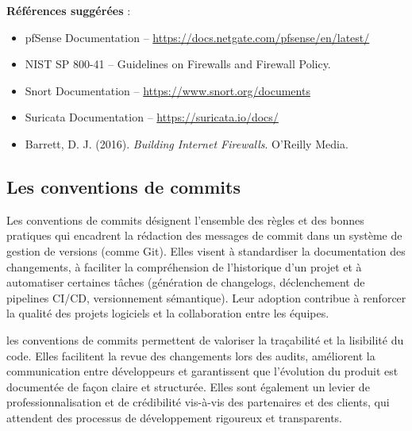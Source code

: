 \textbf{Références suggérées} :
\begin{itemize}
	\item pfSense Documentation – \url{https://docs.netgate.com/pfsense/en/latest/}
	\item NIST SP 800-41 – Guidelines on Firewalls and Firewall Policy.
	\item Snort Documentation – \url{https://www.snort.org/documents}
	\item Suricata Documentation – \url{https://suricata.io/docs/}
	\item Barrett, D. J. (2016). \textit{Building Internet Firewalls}. O’Reilly Media.
\end{itemize}

\subsection{Les conventions de commits}

Les conventions de commits désignent l’ensemble des règles et des bonnes pratiques qui encadrent la rédaction des messages de commit dans un système de gestion de versions (comme Git). Elles visent à standardiser la documentation des changements, à faciliter la compréhension de l’historique d’un projet et à automatiser certaines tâches (génération de changelogs, déclenchement de pipelines CI/CD, versionnement sémantique). Leur adoption contribue à renforcer la qualité des projets logiciels et la collaboration entre les équipes.

 les conventions de commits permettent de valoriser la traçabilité et la lisibilité du code. Elles facilitent la revue des changements lors des audits, améliorent la communication entre développeurs et garantissent que l’évolution du produit est documentée de façon claire et structurée. Elles sont également un levier de professionnalisation et de crédibilité vis-à-vis des partenaires et des clients, qui attendent des processus de développement rigoureux et transparents.

